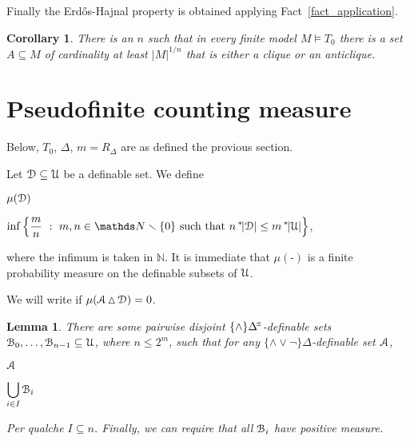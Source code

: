 \documentclass[10pt,oneside, openany]{book}
\renewcommand*{\emph}[1]{%
   \smash{\tikz[baseline]\node[rectangle, fill=green!40, rounded corners, inner xsep=0.5ex, inner ysep=0.2ex, anchor=base, minimum height = 2.7ex]{#1};}}
\def\models{\vDash}
\def\NN{\mathds N}
\def\pmDelta{\Delta\hskip-.3ex\raisebox{1ex}{\tiny$\pm$}}
\def\sm{\smallsetminus}
\def\simdiff{\mathop\vartriangle}
\def\D{\EuScript D}
\def\Aa{\EuScript A}
\def\U{\EuScript U}
\def\B{\EuScript B}
\newcounter{thm}[chapter]
\theoremstyle{mio}
\newtheorem{corollary}[thm]{Corollary}
\newtheorem{lemma}[thm]{Lemma}
\theoremstyle{liscio}
\def\QED{\noindent\nolinebreak[4]\hfill\rlap{\ \ $\Box$}\medskip}
\def\ns{{}^*\kern-.3ex}
\begin{document}
Finally the Erd\H{o}s-Hajnal property is obtained applying Fact~\ref{fact_application}.

\begin{corollary}
  There is an $n$ such that in every finite model $M\models T_0$ there is a set $A\subseteq M$ of cardinality at least $|M|^{1/n}$ that is either a clique or an anticlique.\QED
\end{corollary}


\section{Pseudofinite counting measure}

\def\ceq#1#2#3{\parbox[t]{10ex}{$\displaystyle #1$}\medrel{#2}$\displaystyle  #3$}

Below, $T_0$, $\Delta$, $m=R_\Delta$ are as defined the provious section.

Let $\D\subseteq\U$ be a definable set.
%
We define

\ceq{\hfill\mu(\D)}
{=}
{\inf\Big\{\frac{m}{n}\ :\ m,n\in\NN\sm\{0\} \text{ such that } n\,\ns|\D|\le m\,\ns|\U|\Big\}},

where the infimum is taken in $\NN$.
%
It is immediate that $\mu(\mbox{-})$ is a finite probability measure on the definable subsets of $\U$.

We will write \emph{$\Aa=_\mu\D$} if $\mu(\Aa\simdiff\D)=0$.

\begin{lemma}\label{lem_atoms}
  There are some pairwise disjoint $\{\wedge\}\pmDelta$-definable sets $\B_0,\dots,\B_{n-1}\subseteq\U$, where $n\le2^m$, such that for any $\{{\wedge}{\vee}{\neg}\}\Delta$-definable set $\Aa$, 
  
  \ceq{\hfill\Aa}{=_\mu}{\bigcup_{i\in I}\B_i}

  Per qualche $I\subseteq n$.
  Finally, we can require that all $\B_i$ have positive measure.  
\end{lemma}
\end{document}
